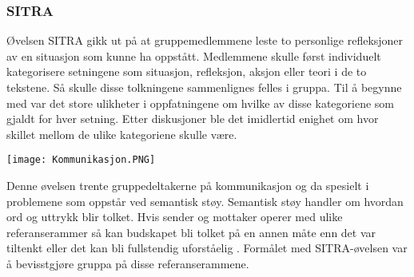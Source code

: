 \subsubsection{SITRA}

Øvelsen SITRA gikk ut på at gruppemedlemmene leste to personlige refleksjoner av en situasjon som kunne ha oppstått.
Medlemmene skulle først individuelt kategorisere setningene som situasjon, refleksjon, aksjon eller teori i de to tekstene.
Så skulle disse tolkningene sammenlignes felles i gruppa.
Til å begynne med var det store ulikheter i oppfatningene om hvilke av disse kategoriene som gjaldt for hver setning.
Etter diskusjoner ble det imidlertid enighet om hvor skillet mellom de ulike kategoriene skulle være.

\begin{center}
	\texttt{[image: Kommunikasjon.PNG]}
\end{center}

Denne øvelsen trente gruppedeltakerne på kommunikasjon og da spesielt i problemene som oppstår ved semantisk støy.
Semantisk støy handler om hvordan ord og uttrykk blir tolket.
Hvis sender og mottaker operer med ulike referanserammer så kan budskapet bli tolket på en annen måte enn det var tiltenkt eller det kan bli fullstendig uforståelig \cite{prosjekteringsledelse}.
Formålet med SITRA-øvelsen var å bevisstgjøre gruppa på disse referanserammene.